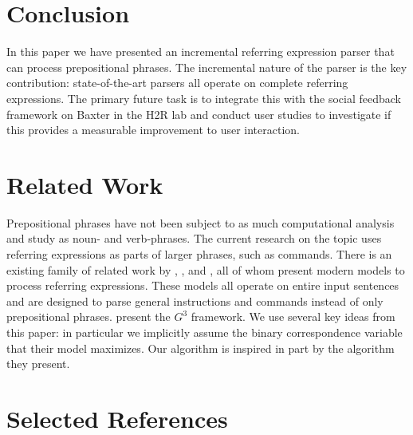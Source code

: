 \documentclass[landscape,a0b]{a0poster}
\numberwithin{equation}{section}
\begin{document}
\begin{multicols*}{3}
\section{Conclusion}
In this paper we have presented an incremental referring expression parser that can process prepositional phrases. The incremental nature of the parser is the key contribution: state-of-the-art parsers all operate on complete referring expressions. The primary future task is to integrate this with the social feedback framework on Baxter in the H2R lab and conduct user studies to investigate if this provides a measurable improvement to user interaction.

\section{Related Work}

Prepositional phrases have not been subject to as much computational analysis and study as noun- and verb-phrases. The current research on the topic uses referring expressions as parts of larger phrases, such as commands. There is an existing family of related work by \citet{tellex2011understanding}, \citet{UW_RSE_ICML2012}, and \citet{artzi2013weakly}, all of whom present modern models to process referring expressions. These models all operate on entire input sentences and are designed to parse general instructions and commands instead of only prepositional phrases. 
\citet{tellex2011understanding} present the $G^3$ framework. We use several key ideas from this paper: in particular we implicitly assume the binary correspondence variable that their model maximizes. Our algorithm is inspired in part by the algorithm they present.


\section{Selected References}
\nocite{artzi2013weakly}
\nocite{tellex2011understanding}
\nocite{UW_RSE_ICML2012}


\printbibliography[heading=none]

\end{multicols*}
\end{document}
